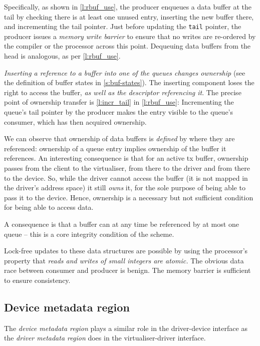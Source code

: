 \documentclass[a4paper,12pt]{report}
\newcommand{\code}[1]{\texttt{#1}}
\newcommand{\Obj}[1]{\textsl{#1}}
\begin{document}
Specifically, as shown in \autoref{l:rbuf_use}, the producer enqueues
a data buffer at the tail by checking there is at least one unused entry,
inserting the new buffer there, and incrementing the tail pointer. Just before
updating the \code{tail} pointer, the producer issues a \emph{memory
  write barrier} to ensure that no writes are re-ordered by the compiler
or the processor across this point.
Dequeuing data buffers from the head is analogous, as per \autoref{l:rbuf_use}.

\emph{Inserting a reference to a buffer into one of the queues changes ownership} (see the
definition of buffer states in \autoref{s:buf-states}). The inserting
component loses the right to access the buffer, \emph{as well as the
descriptor referencing it}. The precise point of
ownership transfer is \autoref{l:incr_tail} in \autoref {l:rbuf_use}:
Incrementing the queue's tail pointer by the producer makes the entry
visible to the queue's consumer, which has then acquired ownership.

We can observe that ownership of data buffers is \emph{defined} by
where they are referenced: ownership of a queue entry implies
ownership of the buffer it references. An interesting consequence is
that for an active \gls{tx} buffer, ownership passes from the client to the
virtualiser, from there to the driver and from there to the
device. So, while the driver cannot access the buffer (it is not
mapped in the driver's address space) it still \emph{owns} it, for the
sole purpose of being able to pass it to the device. Hence, ownership
is a necessary but not sufficient condition for being able to access
data.

A consequence is that a buffer can at any time be referenced by at most one queue
-- this is a core integrity condition of the scheme.

Lock-free updates to these data structures are possible by
using the processor's property that \emph{reads and writes of small
integers are atomic.} The obvious data race between consumer and
producer is benign. The memory barrier is sufficient
to ensure consistency.

\subsection{Device metadata region}\label{s:dev-md}

The \Obj{device metadata region} plays a similar role in the driver-device interface
as the \Obj{driver metadata region} does in the virtualiser-driver interface.
\end{document}
